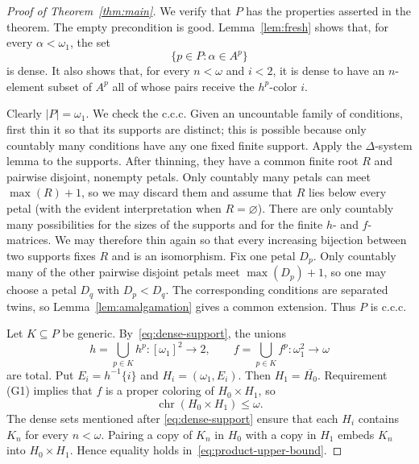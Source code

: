 \documentclass[10pt,a4paper]{amsart}
\numberwithin{equation}{section}
\theoremstyle{definition}
\theoremstyle{remark}
\newcommand{\chr}{\operatorname{chr}}
\begin{document}
\begin{proof}[Proof of Theorem~\ref{thm:main}]
We verify that $P$ has the properties asserted in the theorem.
The empty precondition is good.  Lemma~\ref{lem:fresh} shows that, for
every $\alpha<\omega_1$, the set
\begin{equation}\label{eq:dense-support}
 \{p\in P:\alpha\in A^p\}
\end{equation}
is dense.  It also shows that, for every $n<\omega$ and $i<2$, it is
dense to have an $n$-element subset of $A^p$ all of whose pairs receive
the $h^p$-color $i$.

Clearly $|P|=\omega_1$.  We check the c.c.c.  Given an uncountable
family of conditions, first thin it so that its supports are distinct;
this is possible because only countably many conditions have any one
fixed finite support.  Apply the $\Delta$-system lemma to the supports.
After thinning, they have a common finite root $R$ and pairwise
disjoint, nonempty petals.  Only countably many petals can meet
$\max(R)+1$, so we may discard them and assume that $R$ lies below
every petal (with the evident interpretation when $R=\varnothing$).
There are only countably many possibilities for the sizes of the
supports and for the finite $h$- and $f$-matrices.  We may therefore
thin again so that every increasing bijection between two supports
fixes $R$ and is an isomorphism.  Fix one petal $D_p$.  Only countably
many of the other pairwise disjoint petals meet $\max(D_p)+1$, so one
may choose a petal $D_q$ with $D_p<D_q$.  The corresponding conditions
are separated twins, so
Lemma~\ref{lem:amalgamation} gives a common extension.  Thus $P$ is
c.c.c.

Let $K\subseteq P$ be generic.  By~\eqref{eq:dense-support}, the unions
\begin{displaymath}
 h=\bigcup_{p\in K}h^p:[\omega_1]^2\longrightarrow2,
 \qquad
 f=\bigcup_{p\in K}f^p:\omega_1^2\longrightarrow\omega
\end{displaymath}
are total.  Put $E_i=h^{-1}\{i\}$ and $H_i=(\omega_1,E_i)$.
Then $H_1=\overline{H_0}$.  Requirement (G1) implies that $f$ is a
proper coloring of $H_0\times H_1$, so
\begin{equation}\label{eq:product-upper-bound}
 \chr(H_0\times H_1)\leq\omega.
\end{equation}
The dense sets mentioned after \eqref{eq:dense-support} ensure that
each $H_i$ contains
$K_n$ for every $n<\omega$.  Pairing a copy of $K_n$ in $H_0$ with a
copy in $H_1$ embeds $K_n$ into $H_0\times H_1$.  Hence equality holds
in~\eqref{eq:product-upper-bound}.


\end{proof}
\end{document}
